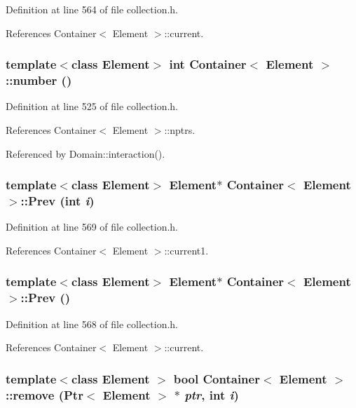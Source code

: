 Definition at line 564 of file collection.h.

References Container$<$ Element $>$::current.\hypertarget{classContainer_fdfb23d60f7482b3790cd780959804cb}{
\subsubsection[{number}]{\setlength{\rightskip}{0pt plus 5cm}template$<$class Element$>$ int {\bf Container}$<$ Element $>$::number ()}}
\label{classContainer_fdfb23d60f7482b3790cd780959804cb}




Definition at line 525 of file collection.h.

References Container$<$ Element $>$::nptrs.

Referenced by Domain::interaction().\hypertarget{classContainer_6cc7f2c5e4d929dab3afdbdd1d193d14}{
\subsubsection[{Prev}]{\setlength{\rightskip}{0pt plus 5cm}template$<$class Element$>$ Element$\ast$ {\bf Container}$<$ Element $>$::Prev (int {\em i})}}
\label{classContainer_6cc7f2c5e4d929dab3afdbdd1d193d14}




Definition at line 569 of file collection.h.

References Container$<$ Element $>$::current1.\hypertarget{classContainer_80e55ec0997a0af36e7f1326cd8c9e6d}{
\subsubsection[{Prev}]{\setlength{\rightskip}{0pt plus 5cm}template$<$class Element$>$ Element$\ast$ {\bf Container}$<$ Element $>$::Prev ()}}
\label{classContainer_80e55ec0997a0af36e7f1326cd8c9e6d}




Definition at line 568 of file collection.h.

References Container$<$ Element $>$::current.\hypertarget{classContainer_58948a285c21989742bd9a3c92266cae}{
\subsubsection[{remove}]{\setlength{\rightskip}{0pt plus 5cm}template$<$class Element $>$ bool {\bf Container}$<$ Element $>$::remove ({\bf Ptr}$<$ Element $>$ $\ast$ {\em ptr}, \/  int {\em i})}}
\label{classContainer_58948a285c21989742bd9a3c92266cae}




